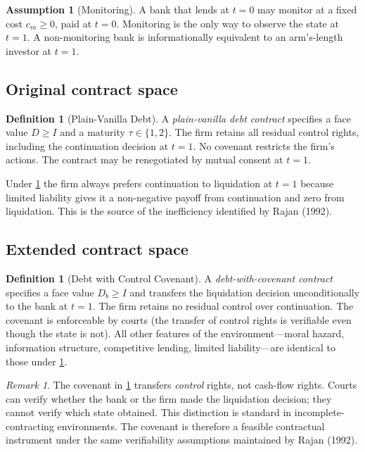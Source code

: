 \documentclass[12pt,a4paper]{article}
\theoremstyle{plain}
\theoremstyle{definition}
\newtheorem{definition}[theorem]{Definition}
\newtheorem{assumption}{Assumption}
\theoremstyle{remark}
\newtheorem{remark}[theorem]{Remark}
\begin{document}
\begin{assumption}[Monitoring]
\label{a:monitoring}
A bank that lends at $t = 0$ may monitor at a fixed cost $c_m \geq 0$, paid at $t = 0$. Monitoring is the only way to observe the state at $t = 1$. A non-monitoring bank is informationally equivalent to an arm's-length investor at $t = 1$.
\end{assumption}

\subsection{Original contract space}

\begin{definition}[Plain-Vanilla Debt]
\label{d:plain-vanilla}
A \emph{plain-vanilla debt contract} specifies a face value $D \geq I$ and a maturity $\tau \in \{1, 2\}$. The firm retains all residual control rights, including the continuation decision at $t = 1$. No covenant restricts the firm's actions. The contract may be renegotiated by mutual consent at $t = 1$.
\end{definition}

Under \cref{d:plain-vanilla} the firm always prefers continuation to liquidation at $t = 1$ because limited liability gives it a non-negative payoff from continuation and zero from liquidation. This is the source of the inefficiency identified by Rajan (1992).

\subsection{Extended contract space}

\begin{definition}[Debt with Control Covenant]
\label{d:covenant}
A \emph{debt-with-covenant contract} specifies a face value $D_b \geq I$ and transfers the liquidation decision unconditionally to the bank at $t = 1$. The firm retains no residual control over continuation. The covenant is enforceable by courts (the transfer of control rights is verifiable even though the state is not). All other features of the environment---moral hazard, information structure, competitive lending, limited liability---are identical to those under \cref{d:plain-vanilla}.
\end{definition}

\begin{remark}
\label{r:covenant-scope}
The covenant in \cref{d:covenant} transfers \emph{control} rights, not cash-flow rights. Courts can verify whether the bank or the firm made the liquidation decision; they cannot verify which state obtained. This distinction is standard in incomplete-contracting environments. The covenant is therefore a feasible contractual instrument under the same verifiability assumptions maintained by Rajan (1992).
\end{remark}
\end{document}
